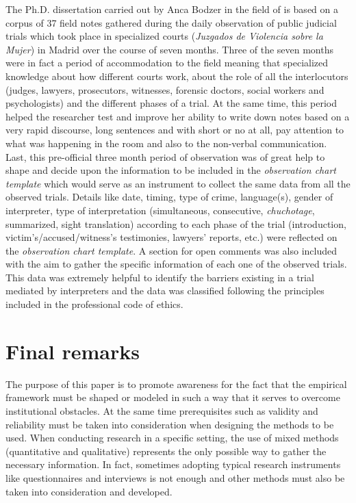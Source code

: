 \documentclass[output=paper]{LSP/langsci}
\begin{document}
The Ph.D. dissertation carried out by Anca Bodzer in the field of  is based on a corpus of 37 field notes gathered during the daily observation of public judicial trials which took place in specialized courts (\textit{Juzgados de Violencia sobre la Mujer}) in Madrid over the course of seven months. Three of the seven months were in fact a period of accommodation to the field meaning that specialized knowledge about how different courts work, about the role of all the interlocutors (judges, lawyers, prosecutors, witnesses, forensic doctors, social workers and psychologists) and the  different phases of a trial. At the same time, this period helped the researcher test and improve her ability to write down notes based on a very rapid discourse, long sentences and with short or no  at all, pay attention to what was happening in the room and also to the non-verbal communication. Last, this pre-official three month period of observation was of great help to shape and decide upon the information to be included in the \textit{observation chart template} which would serve as an instrument to collect the same data from all the observed trials. Details like date, timing, type of crime, language(s), gender of interpreter, type of interpretation (simultaneous, consecutive, \textit{chuchotage}, summarized, sight translation) according to each phase of the trial (introduction, victim's\slash accused\slash witness's testimonies, lawyers' reports, etc.) were reflected on the \textit{observation chart template}. A section for open comments was also included with the aim to gather the specific information of each one of the observed trials. This data was extremely helpful to identify the barriers existing in a trial mediated by interpreters and the data was classified following the principles included in the professional code of ethics.

\section{Final remarks}
The purpose of this paper is to promote awareness for the fact that the empirical framework must be shaped or modeled in such a way that it serves to overcome institutional obstacles. At the same time prerequisites such as validity and reliability must be taken into consideration when designing the methods to be used. When conducting research in a specific setting, the use of mixed methods (quantitative and qualitative) represents the only possible way to gather the necessary information. In fact, sometimes adopting typical research instruments like questionnaires and interviews is not enough and other methods must also be taken into consideration and developed. 
\end{document}
